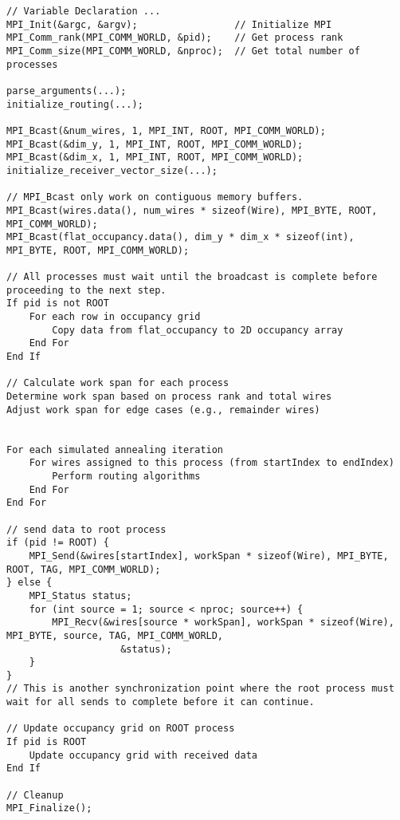\documentclass[letterpaper,11pt]{exam}
\begin{document}
\begin{questions}
\begin{enumerate}[label=\roman*.]
              \begin{lstlisting}
// Variable Declaration ...
MPI_Init(&argc, &argv);                 // Initialize MPI
MPI_Comm_rank(MPI_COMM_WORLD, &pid);    // Get process rank
MPI_Comm_size(MPI_COMM_WORLD, &nproc);  // Get total number of processes

parse_arguments(...);
initialize_routing(...);

MPI_Bcast(&num_wires, 1, MPI_INT, ROOT, MPI_COMM_WORLD);
MPI_Bcast(&dim_y, 1, MPI_INT, ROOT, MPI_COMM_WORLD);
MPI_Bcast(&dim_x, 1, MPI_INT, ROOT, MPI_COMM_WORLD);
initialize_receiver_vector_size(...);

// MPI_Bcast only work on contiguous memory buffers.
MPI_Bcast(wires.data(), num_wires * sizeof(Wire), MPI_BYTE, ROOT, MPI_COMM_WORLD);
MPI_Bcast(flat_occupancy.data(), dim_y * dim_x * sizeof(int), MPI_BYTE, ROOT, MPI_COMM_WORLD);

// All processes must wait until the broadcast is complete before proceeding to the next step.
If pid is not ROOT
    For each row in occupancy grid
        Copy data from flat_occupancy to 2D occupancy array
    End For
End If

// Calculate work span for each process
Determine work span based on process rank and total wires
Adjust work span for edge cases (e.g., remainder wires)


For each simulated annealing iteration
    For wires assigned to this process (from startIndex to endIndex)
        Perform routing algorithms
    End For
End For

// send data to root process
if (pid != ROOT) {
    MPI_Send(&wires[startIndex], workSpan * sizeof(Wire), MPI_BYTE, ROOT, TAG, MPI_COMM_WORLD);
} else {
    MPI_Status status;
    for (int source = 1; source < nproc; source++) {
        MPI_Recv(&wires[source * workSpan], workSpan * sizeof(Wire), MPI_BYTE, source, TAG, MPI_COMM_WORLD,
                    &status);
    }
}
// This is another synchronization point where the root process must wait for all sends to complete before it can continue.

// Update occupancy grid on ROOT process
If pid is ROOT
    Update occupancy grid with received data
End If

// Cleanup
MPI_Finalize();
        \end{lstlisting}


\end{enumerate}
\end{questions}
\end{document}
